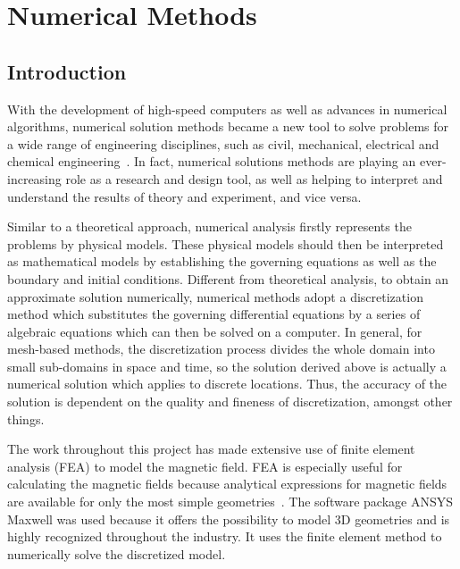 \chapter{Numerical Methods}\label{ch:numericalMethods}


\section{Introduction}
With the development of high-speed computers as well as advances in numerical algorithms, numerical solution methods became a new tool to solve problems for a wide range of engineering disciplines, such as civil, mechanical, electrical and chemical engineering~\cite{Martin1973,Reddy1993}. In fact, numerical solutions methods are playing an ever-increasing role as a research and design tool, as well as helping to interpret and understand the results of theory and experiment, and vice versa.

Similar to a theoretical approach, numerical analysis firstly represents the problems by physical models. These physical models should then be interpreted as mathematical models by establishing the governing equations as well as the boundary and initial conditions. Different from theoretical analysis, to obtain an approximate solution numerically, numerical methods adopt a discretization method which substitutes the governing differential equations by a series of algebraic equations which can then be solved on a computer. In general, for mesh-based methods, the discretization process divides the whole domain into small sub-domains in space and time, so the solution derived above is actually a numerical solution which applies to discrete locations. Thus, the accuracy of the solution is dependent on the quality and fineness of discretization, amongst other things.

The work throughout this project has made extensive use of finite element analysis (FEA) to model the magnetic field. FEA is especially useful for calculating the magnetic fields because analytical expressions for magnetic fields are available for only the most simple geometries~\cite{Furlani2006}. The software package ANSYS Maxwell was used because it offers the possibility to model 3D geometries and is highly recognized throughout the industry. It uses the finite element method to numerically solve the discretized model. 

